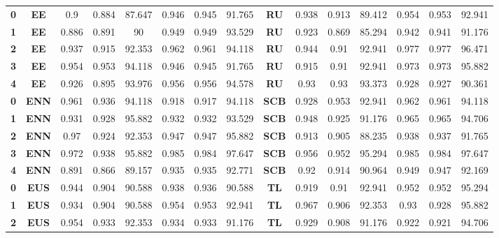 {{\begin{tabular}{c|c|cccccc|ccccccc}
\textbf{0} & \textbf{EE} & 0.9   & 0.884 & 87.647 & 0.946 & 0.945 & 91.765 & \multicolumn{1}{c|}{\textbf{RU}} & 0.938 & 0.913 & 89.412 & 0.954 & 0.953 & 92.941 \\
\textbf{1} & \textbf{EE} & 0.886 & 0.891 & 90    & 0.949 & 0.949 & 93.529 & \multicolumn{1}{c|}{\textbf{RU}} & 0.923 & 0.869 & 85.294 & 0.942 & 0.941 & 91.176 \\
\textbf{2} & \textbf{EE} & 0.937 & 0.915 & 92.353 & 0.962 & 0.961 & 94.118 & \multicolumn{1}{c|}{\textbf{RU}} & 0.944 & 0.91  & 92.941 & 0.977 & 0.977 & 96.471 \\
\textbf{3} & \textbf{EE} & 0.954 & 0.953 & 94.118 & 0.946 & 0.945 & 91.765 & \multicolumn{1}{c|}{\textbf{RU}} & 0.915 & 0.91  & 92.941 & 0.973 & 0.973 & 95.882 \\
\textbf{4} & \textbf{EE} & 0.926 & 0.895 & 93.976 & 0.956 & 0.956 & 94.578 & \multicolumn{1}{c|}{\textbf{RU}} & 0.93  & 0.93  & 93.373 & 0.928 & 0.927 & 90.361 \\
\textbf{0} & \textbf{ENN} & 0.961 & 0.936 & 94.118 & 0.918 & 0.917 & 94.118 & \multicolumn{1}{c|}{\textbf{SCB}} & 0.928 & 0.953 & 92.941 & 0.962 & 0.961 & 94.118 \\
\textbf{1} & \textbf{ENN} & 0.931 & 0.928 & 95.882 & 0.932 & 0.932 & 93.529 & \multicolumn{1}{c|}{\textbf{SCB}} & 0.948 & 0.925 & 91.176 & 0.965 & 0.965 & 94.706 \\
\textbf{2} & \textbf{ENN} & 0.97  & 0.924 & 92.353 & 0.947 & 0.947 & 95.882 & \multicolumn{1}{c|}{\textbf{SCB}} & 0.913 & 0.905 & 88.235 & 0.938 & 0.937 & 91.765 \\
\textbf{3} & \textbf{ENN} & 0.972 & 0.938 & 95.882 & 0.985 & 0.984 & 97.647 & \multicolumn{1}{c|}{\textbf{SCB}} & 0.956 & 0.952 & 95.294 & 0.985 & 0.984 & 97.647 \\
\textbf{4} & \textbf{ENN} & 0.891 & 0.866 & 89.157 & 0.935 & 0.935 & 92.771 & \multicolumn{1}{c|}{\textbf{SCB}} & 0.92  & 0.914 & 90.964 & 0.949 & 0.947 & 92.169 \\
\textbf{0} & \textbf{EUS} & 0.944 & 0.904 & 90.588 & 0.938 & 0.936 & 90.588 & \multicolumn{1}{c|}{\textbf{TL}} & 0.919 & 0.91  & 92.941 & 0.952 & 0.952 & 95.294 \\
\textbf{1} & \textbf{EUS} & 0.934 & 0.904 & 90.588 & 0.954 & 0.953 & 92.941 & \multicolumn{1}{c|}{\textbf{TL}} & 0.967 & 0.906 & 92.353 & 0.93  & 0.928 & 95.882 \\
\textbf{2} & \textbf{EUS} & 0.954 & 0.933 & 92.353 & 0.934 & 0.933 & 91.176 & \multicolumn{1}{c|}{\textbf{TL}} & 0.929 & 0.908 & 91.176 & 0.922 & 0.921 & 94.706 \\

\end{tabular}}}
